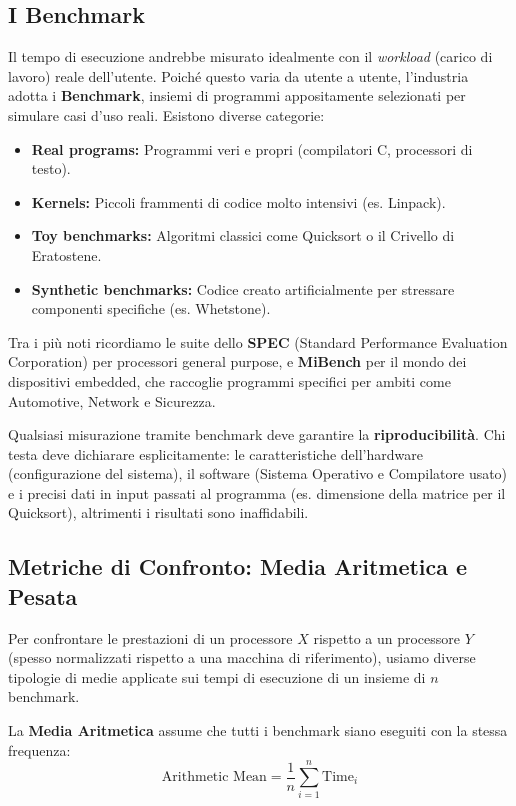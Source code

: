 \subsection{I Benchmark}
Il tempo di esecuzione andrebbe misurato idealmente con il \textit{workload} (carico di lavoro) reale dell'utente. Poiché questo varia da utente a utente, l'industria adotta i \textbf{Benchmark}, insiemi di programmi appositamente selezionati per simulare casi d'uso reali. Esistono diverse categorie:
\begin{itemize}
    \item \textbf{Real programs:} Programmi veri e propri (compilatori C, processori di testo).
    \item \textbf{Kernels:} Piccoli frammenti di codice molto intensivi (es. Linpack).
    \item \textbf{Toy benchmarks:} Algoritmi classici come Quicksort o il Crivello di Eratostene.
    \item \textbf{Synthetic benchmarks:} Codice creato artificialmente per stressare componenti specifiche (es. Whetstone).
\end{itemize}

Tra i più noti ricordiamo le suite dello \textbf{SPEC} (Standard Performance Evaluation Corporation) per processori general purpose, e \textbf{MiBench} per il mondo dei dispositivi embedded, che raccoglie programmi specifici per ambiti come Automotive, Network e Sicurezza.

\begin{remark}[La Riproducibilità]
Qualsiasi misurazione tramite benchmark deve garantire la \textbf{riproducibilità}. Chi testa deve dichiarare esplicitamente: le caratteristiche dell'hardware (configurazione del sistema), il software (Sistema Operativo e Compilatore usato) e i precisi dati in input passati al programma (es. dimensione della matrice per il Quicksort), altrimenti i risultati sono inaffidabili.
\end{remark}

\subsection{Metriche di Confronto: Media Aritmetica e Pesata}
Per confrontare le prestazioni di un processore \( X \) rispetto a un processore \( Y \) (spesso normalizzati rispetto a una macchina di riferimento), usiamo diverse tipologie di medie applicate sui tempi di esecuzione di un insieme di \( n \) benchmark.

La \textbf{Media Aritmetica} assume che tutti i benchmark siano eseguiti con la stessa frequenza:
\[ \text{Arithmetic Mean} = \frac{1}{n} \sum_{i=1}^{n} \text{Time}_i \]


